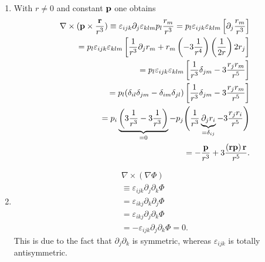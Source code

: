 {\begin{enumerate}
\item    With $r\neq 0$ and constant $\bf p$ one obtains
\begin{equation}
\begin{split}
  \nabla \times ({\bf p} \times \frac{{\bf r}}{r^3})
 \equiv
  \varepsilon_{ijk}\partial_j\varepsilon_{klm}p_l\frac{r_m}{r^3}=
  p_l \varepsilon_{ijk} \varepsilon_{klm}
  \left[\partial_j\frac{r_m}{r^3}\right]  \\
 = p_l
    \varepsilon_{ijk}\varepsilon_{klm}
  \left[
    \frac{1}{r^3}\partial_j r_m + r_m
    \left(-3\frac{1}{r^4}\right)\left(\frac{1}{2r}\right)2r_j
  \right]  \\
  = p_l\varepsilon_{ijk}\varepsilon_{klm}
  \left[
    \frac{1}{r^3}\delta_{jm} - 3\frac{r_j r_m}{r^5}
  \right]  \\
  = p_l(\delta_{il}\delta_{jm}-\delta_{im}\delta_{jl})
  \left[
    \frac{1}{r^3}\delta_{jm} - 3\frac{r_j r_m}{r^5}
  \right]  \\
  = p_i \underbrace{\left(3\frac{1}{r^3}-3\frac{1}{r^3}\right)}_{=0}-
  p_j
  \Biggl({1\over {r^3}}
    \underbrace{{\partial_j r_i}}_{=\delta_{ij}}-
    3\frac{r_j r_i}{r^5}
  \Biggr)  \\
  = -\frac{{\bf p}}{r^3}+3\frac{\left({\bf r} {\bf p}\right){\bf r}}{r^5}
.
\end{split}
\end{equation}



\item
\begin{equation}
\begin{split}
{\nabla} \times({\nabla }\Phi )\\
\equiv
\varepsilon_{ijk} \partial_j \partial_k \Phi \\ =
\varepsilon_{ikj} \partial_k \partial_j \Phi  \\=
\varepsilon_{ikj} \partial_j \partial_k \Phi  \\=
-\varepsilon_{ijk} \partial_j \partial_k \Phi =0.
\end{split}
\end{equation}
This is due to the fact that $\partial_j \partial_k$ is  symmetric, whereas
$\varepsilon_{ijk}$ is totally antisymmetric.



\end{enumerate}}
